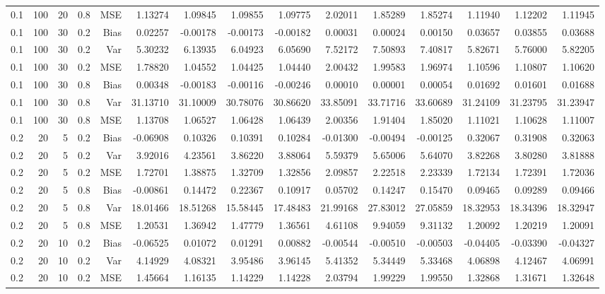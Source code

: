\begin{table}[!htbp]
\begin{tabular}{lrrrrrrrrrrrrrr}
0.1 & 100 & 20 & 0.8 & MSE & 1.13274 & 1.09845 & 1.09855 & 1.09775 & 2.02011 & 1.85289 & 1.85274 & 1.11940 & 1.12202 & 1.11945 \\
0.1 & 100 & 30 & 0.2 & Bias & 0.02257 & -0.00178 & -0.00173 & -0.00182 & 0.00031 & 0.00024 & 0.00150 & 0.03657 & 0.03855 & 0.03688 \\
0.1 & 100 & 30 & 0.2 & Var & 5.30232 & 6.13935 & 6.04923 & 6.05690 & 7.52172 & 7.50893 & 7.40817 & 5.82671 & 5.76000 & 5.82205 \\
0.1 & 100 & 30 & 0.2 & MSE & 1.78820 & 1.04552 & 1.04425 & 1.04440 & 2.00432 & 1.99583 & 1.96974 & 1.10596 & 1.10807 & 1.10620 \\
0.1 & 100 & 30 & 0.8 & Bias & 0.00348 & -0.00183 & -0.00116 & -0.00246 & 0.00010 & 0.00001 & 0.00054 & 0.01692 & 0.01601 & 0.01688 \\
0.1 & 100 & 30 & 0.8 & Var & 31.13710 & 31.10009 & 30.78076 & 30.86620 & 33.85091 & 33.71716 & 33.60689 & 31.24109 & 31.23795 & 31.23947 \\
0.1 & 100 & 30 & 0.8 & MSE & 1.13708 & 1.06527 & 1.06428 & 1.06439 & 2.00356 & 1.91404 & 1.85020 & 1.11021 & 1.10628 & 1.11007 \\
0.2 &  20 &  5 & 0.2 & Bias & -0.06908 & 0.10326 & 0.10391 & 0.10284 & -0.01300 & -0.00494 & -0.00125 & 0.32067 & 0.31908 & 0.32063 \\
0.2 &  20 &  5 & 0.2 & Var & 3.92016 & 4.23561 & 3.86220 & 3.88064 & 5.59379 & 5.65006 & 5.64070 & 3.82268 & 3.80280 & 3.81888 \\
0.2 &  20 &  5 & 0.2 & MSE & 1.72701 & 1.38875 & 1.32709 & 1.32856 & 2.09857 & 2.22518 & 2.23339 & 1.72134 & 1.72391 & 1.72036 \\
0.2 &  20 &  5 & 0.8 & Bias & -0.00861 & 0.14472 & 0.22367 & 0.10917 & 0.05702 & 0.14247 & 0.15470 & 0.09465 & 0.09289 & 0.09466 \\
0.2 &  20 &  5 & 0.8 & Var & 18.01466 & 18.51268 & 15.58445 & 17.48483 & 21.99168 & 27.83012 & 27.05859 & 18.32953 & 18.34396 & 18.32947 \\
0.2 &  20 &  5 & 0.8 & MSE & 1.20531 & 1.36942 & 1.47779 & 1.36561 & 4.61108 & 9.94059 & 9.31132 & 1.20092 & 1.20219 & 1.20091 \\
0.2 &  20 & 10 & 0.2 & Bias & -0.06525 & 0.01072 & 0.01291 & 0.00882 & -0.00544 & -0.00510 & -0.00503 & -0.04405 & -0.03390 & -0.04327 \\
0.2 &  20 & 10 & 0.2 & Var & 4.14929 & 4.08321 & 3.95486 & 3.96145 & 5.41352 & 5.34449 & 5.33468 & 4.06898 & 4.12467 & 4.06991 \\
0.2 &  20 & 10 & 0.2 & MSE & 1.45664 & 1.16135 & 1.14229 & 1.14228 & 2.03794 & 1.99229 & 1.99550 & 1.32868 & 1.31671 & 1.32648 \\

\end{tabular}
\end{table}
